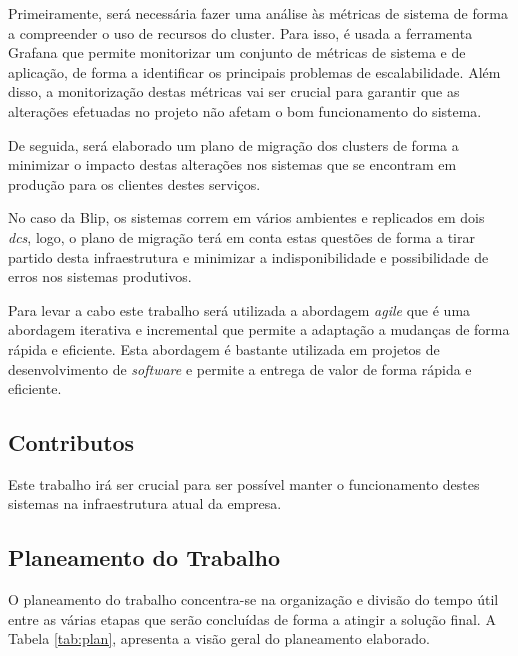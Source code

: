 Primeiramente, será necessária fazer uma análise às métricas de sistema de forma a compreender
o uso de recursos do \gls{cluster}. Para isso, é usada a ferramenta Grafana que permite
monitorizar um conjunto de métricas de sistema e de aplicação, de forma a identificar os principais
problemas de escalabilidade. Além disso, a monitorização destas métricas vai ser crucial para
garantir que as alterações efetuadas no projeto não afetam o bom funcionamento do sistema.

De seguida, será elaborado um plano de migração dos \glspl{cluster} de forma a minimizar o 
impacto destas alterações nos sistemas que se encontram em produção para os clientes destes serviços.

No caso da Blip, os sistemas correm em vários ambientes e replicados em dois \textit{\glspl{dc}},
logo, o plano de migração terá em conta estas questões de forma a tirar partido desta infraestrutura
e minimizar a indisponibilidade e possibilidade de erros nos sistemas produtivos.

Para levar a cabo este trabalho será utilizada a abordagem \textit{agile} que é uma abordagem
iterativa e incremental que permite a adaptação a mudanças de forma rápida e eficiente. Esta abordagem
é bastante utilizada em projetos de desenvolvimento de \textit{software} e permite a entrega de valor
de forma rápida e eficiente.

\subsection{Contributos}

Este trabalho irá ser crucial para ser possível manter o funcionamento destes sistemas na
infraestrutura atual da empresa.


\subsection{Planeamento do Trabalho}

O planeamento do trabalho concentra-se na organização e divisão do tempo útil entre as várias etapas
que serão concluídas de forma a atingir a solução final. A Tabela \ref{tab:plan}, apresenta a visão
geral do planeamento elaborado.

